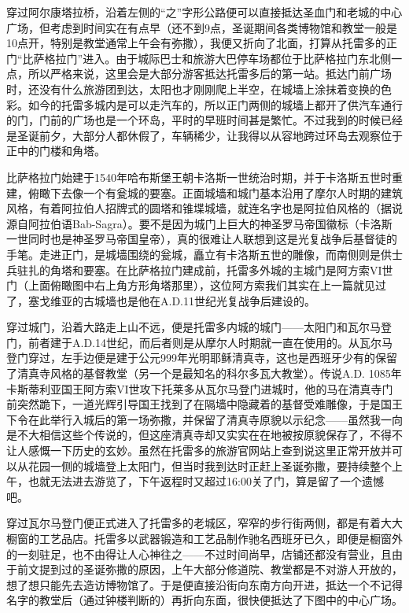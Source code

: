 \documentclass[]{book}
\begin{document}
穿过阿尔康塔拉桥，沿着左侧的``之''字形公路便可以直接抵达圣血门和老城的中心广场，但考虑到时间实在有点早（还不到9点，圣诞期间各类博物馆和教堂一般是10点开，特别是教堂通常上午会有弥撒），我便又折向了北面，打算从托雷多的正门``比萨格拉门''进入。由于城际巴士和旅游大巴停车场都位于比萨格拉门东北侧一点，所以严格来说，这里会是大部分游客抵达托雷多后的第一站。抵达门前广场时，还没有什么旅游团到达，太阳也才刚刚爬上半空，在城墙上涂抹着变换的色彩。如今的托雷多城内是可以走汽车的，所以正门两侧的城墙上都开了供汽车通行的门，门前的广场也是一个环岛，平时的早班时间甚是繁忙。不过我到的时候已经是圣诞前夕，大部分人都休假了，车辆稀少，让我得以从容地跨过环岛去观察位于正中的门楼和角塔。

比萨格拉门始建于1540年哈布斯堡王朝卡洛斯一世统治时期，并于卡洛斯五世时重建，俯瞰下去像一个有瓮城的要塞。正面城墙和城门基本沿用了摩尔人时期的建筑风格，有着阿拉伯人招牌式的圆塔和锥堞城墙，就连名字也是阿拉伯风格的（据说源自阿拉伯语Bab-Sagra）。要不是因为城门上巨大的神圣罗马帝国徽标（卡洛斯一世同时也是神圣罗马帝国皇帝），真的很难让人联想到这是光复战争后基督徒的手笔。走进正门，是城墙围绕的瓮城，矗立有卡洛斯五世的雕像，而南侧则是供士兵驻扎的角塔和要塞。在比萨格拉门建成前，托雷多外城的主城门是阿方索VI世门（上面俯瞰图中右上角方形角塔那里），这位阿方索我们其实在上一篇就见过了，塞戈维亚的古城墙也是他在A.D.11世纪光复战争后建设的。

穿过城门，沿着大路走上山不远，便是托雷多内城的城门------太阳门和瓦尔马登门，前者建于A.D.14世纪，而后者则是从摩尔人时期就一直在使用的。从瓦尔马登门穿过，左手边便是建于公元999年光明耶稣清真寺，这也是西班牙少有的保留了清真寺风格的基督教堂（另一个是最知名的科尔多瓦大教堂）。传说A.D. 1085年卡斯蒂利亚国王阿方索VI世攻下托莱多从瓦尔马登门进城时，他的马在清真寺门前突然跪下，一道光辉引导国王找到了在隔墙中隐藏着的基督受难雕像，于是国王下令在此举行入城后的第一场弥撒，并保留了清真寺原貌以示纪念------虽然我一向是不大相信这些个传说的，但这座清真寺却又实实在在地被按原貌保存了，不得不让人感慨一下历史的玄妙。虽然在托雷多的旅游官网站上查到说这里正常开放并可以从花园一侧的城墙登上太阳门，但当时我到达时正赶上圣诞弥撒，要持续整个上午，也就无法进去游览了，下午返程时又超过16:00关了门，算是留了一个遗憾吧。

穿过瓦尔马登门便正式进入了托雷多的老城区，窄窄的步行街两侧，都是有着大大橱窗的工艺品店。托雷多以武器锻造和工艺品制作驰名西班牙已久，即便是橱窗外的一刻驻足，也不由得让人心神往之------不过时间尚早，店铺还都没有营业，且由于前文提到过的圣诞弥撒的原因，上午大部分修道院、教堂都是不对游人开放的，想了想只能先去造访博物馆了。于是便直接沿街向东南方向开进，抵达一个不记得名字的教堂后（通过钟楼判断的）再折向东面，很快便抵达了下图中的中心广场。
\end{document}

